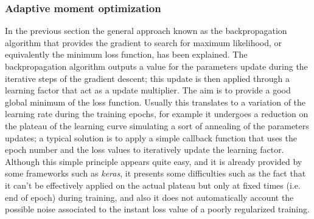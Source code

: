 \subsubsection{Adaptive moment optimization}
In the previous section the general approach known as the backpropagation algorithm that provides the gradient to search for maximum likelihood, or equivalently the minimum loss function, has been explained. 
The backpropagation algorithm outputs a value for the parameters update during the iterative steps of the gradient descent; this update is then applied through a learning factor that act as a update multiplier. The aim is to provide a good global minimum of the loss function.
Usually this translates to a variation of the learning rate during the training epochs, for example it undergoes a reduction on the plateau of the learning curve simulating a sort of annealing of the parameters updates; a typical solution is to apply a simple callback function that uses the epoch number and the loss values to iteratively update the learning factor.
Although this simple principle appears quite easy, and it is already provided by some frameworks such as \textit{keras}, it presents some difficulties such as the fact that it can't be effectively applied on the actual plateau but only at fixed times (i.e. end of epoch) during training, and also it does not automatically account the possible noise associated to the instant loss value of a poorly regularized training.

